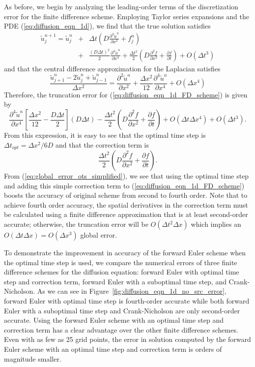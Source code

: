 \documentclass[fleqn,12pt,twoside]{article}
\newcommand{\beq}{\begin{equation}}
\newcommand{\eeq}{\end{equation}}
\newcommand{\bea}{\begin{eqnarray}}
\newcommand{\eea}{\end{eqnarray}}
\def\pt{\partial t}
\def\px{\partial x}
\def\tu{\tilde{u}}
\def\dt{\Delta t}
\def\dx{\Delta x}
\def\dto{\dt_{opt}}
\begin{document}
As before, we begin by analyzing the leading-order terms of the 
discretization error for the finite difference scheme.  Employing Taylor
series expansions and the PDE (\ref{eq:diffusion_eqn_1d}),
we find that the true solution satisfies
\bea
  \tu^{n+1}_j = \tu^{n}_j 
  &+& \dt \left( D \frac{\partial^2 \tu^n}{\px^2} + f^n_j \right)
  \nonumber \\
  &+& \frac{(D\dt)^2}{2} \frac{\partial^4 \tu^n}{\px^4} 
  + \frac{\dt^2}{2} \left( D\frac{\partial^2 f}{\px^2}
                         + \frac{\partial f}{\pt} \right)
  + O \left( \dt^3 \right)
  \label{eq:diffusion_eqn_1d_time_err} 
\eea
and that the central difference approximation for the Laplacian satisfies
\beq
  \frac{\tu^{n}_{j+1} -2 \tu^{n}_j + \tu^{n}_{j-1}}{\dx^2}  =
  \frac{\partial^2 \tu^n}{\px^2} 
  + \frac{\dx^2}{12} \frac{\partial^4 \tu^n}{\px^4} 
  + O(\dx^4)
  \label{eq:diffusion_eqn_1d_space_err}
\eeq
Therefore, the truncation error for (\ref{eq:diffusion_eqn_1d_FD_scheme})
is given by
\beq
  \frac{\partial^4 \tu^n}{\px^4} 
    \left[ \frac{\dx^2}{12} - \frac{D \dt}{2} \right] (D \dt)
    - \frac{\dt^2}{2} \left( D \frac{\partial^2 f}{\px^2} 
                           + \frac{\partial f}{\pt} \right)
      + O(\dt \dx^4) + O(\dt^3).
  \label{eq:diffusion_eqn_1d_trunc_err}
\eeq
From this expression, it is easy to see that the optimal time step is 
$\dto = \dx^2/6D$ and that the correction term is
\beq
\frac{\dt^2}{2} \left( D \frac{\partial^2 f}{\px^2} 
                     + \frac{\partial f}{\pt} \right).
\eeq
From (\ref{eq:global_error_ots_simplified}), we see that using the optimal 
time step and adding this simple correction term to 
(\ref{eq:diffusion_eqn_1d_FD_scheme}) boosts the accuracy of original scheme 
from second to fourth order.  Note that to achieve fourth order accuracy, 
the spatial derivatives in the correction term must be calculated using a
finite difference approximation that is at least second-order accurate; 
otherwise, the truncation error will be $O(\dt^2 \dx)$ which implies an 
$O(\dt \dx) = O(\dx^3)$ global error. 

To demonstrate the improvement in accuracy of the forward Euler scheme when 
the optimal time step is used, we compare the numerical errors of three finite 
difference schemes for the diffusion equation: forward Euler with optimal
time step and correction term, forward Euler with a suboptimal time step, and 
Crank-Nicholson.  As we can see in 
Figure~\ref{fig:diffusion_eqn_1d_no_src_error}, forward Euler with optimal 
time step is fourth-order accurate while both forward Euler with a suboptimal 
time step and Crank-Nicholson are only second-order accurate.  
Using the forward Euler scheme with an optimal time step and correction term 
has a clear advantage over the other finite difference schemes.  Even with as 
few as 25 grid points, the error in solution computed by the forward Euler 
scheme with an optimal time step and correction term is orders of magnitude 
smaller. 
\end{document}
